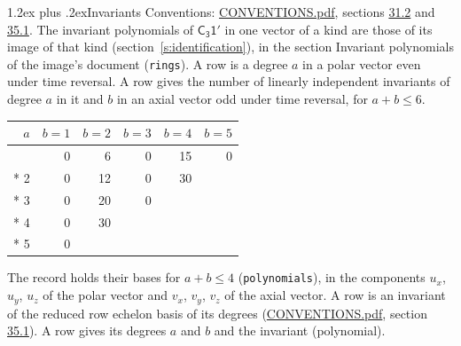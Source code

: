 \documentclass[10pt,a4paper]{article}
\makeatletter
\renewcommand\section{\@startsection{section}{1}{\z@}{-3ex plus -1ex minus -.2ex}%
  {1.2ex plus .2ex}{\normalfont\large\sffamily\bfseries\color{parttitle}}}
\numberwithin{equation}{section}
\newcommand{\grp}[1]{\mathsf{#1}}
\makeatother
\begin{document}
\section{Invariants}\label{s:invariants}
Conventions: \href{../../CONVENTIONS.pdf}{CONVENTIONS.pdf}, sections \href{../../CONVENTIONS.pdf\#conv.31.2}{31.2} and \href{../../CONVENTIONS.pdf\#conv.35.1}{35.1}.
The invariant polynomials of $\grp{C_{3}1'}$ in one vector of a kind are those of its image of that kind (section~\ref{s:identification}), in the section Invariant polynomials of the image's document (\texttt{rings}).
\leavevmode\label{n:index.degree.polar}\label{n:index.degree.axial}A row is a degree $a$ in a polar vector even under time reversal. A row gives the number of linearly independent invariants of degree $a$ in it and $b$ in an axial vector odd under time reversal, for $a + b \le 6$.
{\small\begin{longtable}{@{}rrrrrr@{}}\toprule
$a$ & $b = 1$ & $b = 2$ & $b = 3$ & $b = 4$ & $b = 5$\\\midrule\endhead
\bottomrule\endfoot\endlastfoot
1 & 0 & 6 & 0 & 15 & 0\\*
2 & 0 & 12 & 0 & 30 & \\*
3 & 0 & 20 & 0 &  & \\*
4 & 0 & 30 &  &  & \\*
5 & 0 &  &  &  & \\
\bottomrule\end{longtable}}
\leavevmode\label{n:local.component.polar}\label{n:local.component.axial}The record holds their bases for $a + b \le 4$ (\texttt{polynomials}), in the components $u_{x}$, $u_{y}$, $u_{z}$ of the polar vector and $v_{x}$, $v_{y}$, $v_{z}$ of the axial vector. \label{n:head.polynomial}A row is an invariant of the reduced row echelon basis of its degrees (\href{../../CONVENTIONS.pdf}{CONVENTIONS.pdf}, section \href{../../CONVENTIONS.pdf\#conv.35.1}{35.1}). A row gives its degrees $a$ and $b$ and the invariant (polynomial).
\end{document}
